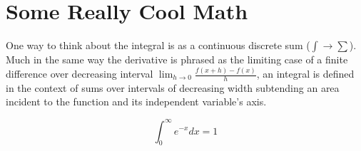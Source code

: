 \documentclass[12pt]{article}
\begin{document}
\section*{Some Really Cool Math}

One way to think about the integral is as a continuous discrete sum ($\int \rightarrow \sum$). Much in the same way the derivative is phrased as the limiting case of a finite difference over decreasing interval $\lim_{h \rightarrow 0} \frac{f(x+h)-f(x)}{h}$, an integral is defined in the context of sums over intervals of decreasing width subtending an area incident to the function and its independent variable's axis.

\[ \displaystyle \int_0^\infty e^{-x} dx = 1 \]
\end{document}
